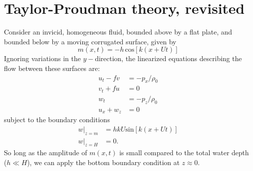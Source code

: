 \documentclass[11pt]{report}
\numberwithin{equation}{section}
\begin{document}
\section{Taylor-Proudman theory, revisited}
\label{prob:taylor-proudman}

Consider an invicid, homogeneous fluid, bounded above by a flat plate, and
bounded below by a moving corrugated surface, given by 
\[m(x,t) = -h\,\mathrm{cos}[k(x+Ut)]\]
Ignoring variations in the $y-$direction, the linearized equations
describing the flow between these surfaces are:
\begin{align}
  u_t - f v &= - p_x/\rho_0 \label{u.moment}\\
  v_t + f u &= 0 \label{v.moment}\\
  w_t &= -p_z/\rho_0 \label{z.moment}\\
  u_x + w_z &= 0 \label{cont}
\end{align}
subject to the boundary conditions
\begin{align}
  w\bigr|_{z=m} &= h k U \mathrm{sin}[k (x + U t)] \\
  w\bigr|_{z=H} &= 0.
\end{align}
So long as the amplitude of $m(x,t)$ is small compared to the total water
depth ($h \ll H$), we can apply the bottom boundary condition at
$z\approx0$.
\end{document}
